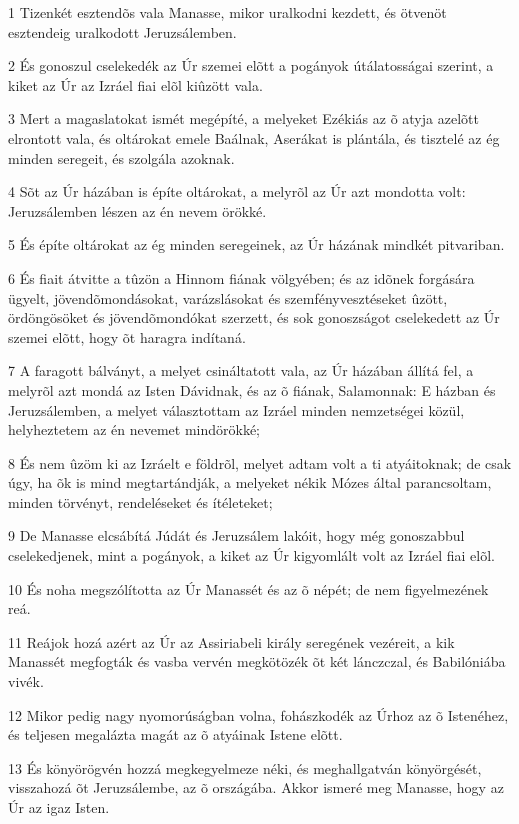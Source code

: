 \par 1 Tizenkét esztendõs vala Manasse, mikor uralkodni kezdett, és ötvenöt esztendeig uralkodott Jeruzsálemben.
\par 2 És gonoszul cselekedék az Úr szemei elõtt a pogányok útálatosságai szerint, a kiket az Úr az Izráel fiai elõl kiûzött vala.
\par 3 Mert a magaslatokat ismét megépíté, a melyeket Ezékiás az õ atyja azelõtt elrontott vala, és oltárokat emele Baálnak, Aserákat  is plántála, és tisztelé az ég minden seregeit, és szolgála azoknak.
\par 4 Sõt az Úr házában is építe oltárokat, a melyrõl az Úr azt mondotta volt: Jeruzsálemben  lészen az én nevem örökké.
\par 5 És építe oltárokat az ég minden seregeinek, az Úr házának mindkét pitvariban.
\par 6 És fiait átvitte a tûzön a Hinnom fiának völgyében; és az idõnek forgására ügyelt, jövendõmondásokat, varázslásokat  és szemfényvesztéseket ûzött, ördöngösöket és jövendõmondókat szerzett, és sok gonoszságot cselekedett az Úr szemei elõtt, hogy õt haragra indítaná.
\par 7 A faragott bálványt, a melyet csináltatott vala, az Úr házában állítá fel, a melyrõl azt mondá az Isten Dávidnak, és az õ fiának, Salamonnak: E házban és Jeruzsálemben, a melyet választottam az Izráel minden nemzetségei közül, helyheztetem az én nevemet mindörökké;
\par 8 És nem ûzöm ki az Izráelt e földrõl, melyet adtam volt a ti atyáitoknak; de csak úgy, ha õk is mind megtartándják,  a melyeket nékik Mózes által parancsoltam, minden törvényt, rendeléseket és ítéleteket;
\par 9 De Manasse elcsábítá Júdát és Jeruzsálem lakóit, hogy még gonoszabbul cselekedjenek, mint a pogányok, a kiket az Úr kigyomlált volt az Izráel fiai elõl.
\par 10 És noha megszólította az Úr Manassét és az õ népét; de nem figyelmezének reá.
\par 11 Reájok hozá azért az Úr az Assiriabeli király seregének vezéreit, a kik Manassét megfogták és vasba vervén megkötözék õt két lánczczal, és Babilóniába vivék.
\par 12 Mikor pedig nagy nyomorúságban volna, fohászkodék az Úrhoz az õ Istenéhez, és teljesen megalázta magát az õ atyáinak Istene elõtt.
\par 13 És könyörögvén hozzá megkegyelmeze néki, és meghallgatván könyörgését, visszahozá õt Jeruzsálembe, az õ országába. Akkor ismeré meg Manasse, hogy az Úr az igaz Isten.
